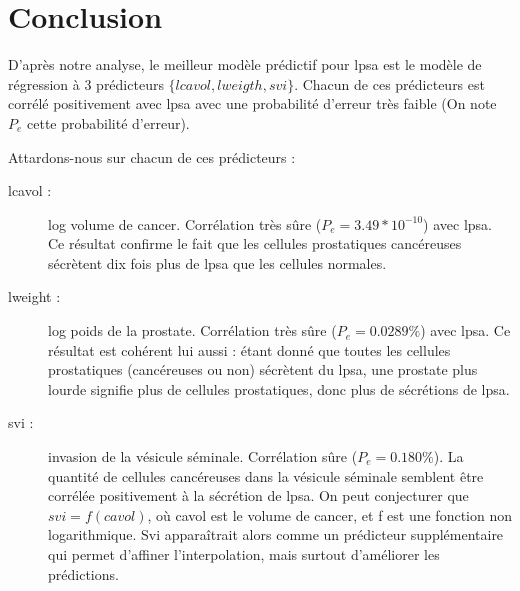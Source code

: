 \documentclass[a4paper, 12pt]{article}
\begin{document}
\begin{enumerate}
\end{enumerate}


\section{Conclusion}

D'après notre analyse, le meilleur modèle prédictif pour lpsa est le modèle de régression à 3 prédicteurs $\{lcavol, lweigth, svi\}$. 
Chacun de ces prédicteurs est corrélé positivement avec lpsa avec une probabilité d'erreur très faible (On note $P_{e}$ cette probabilité d'erreur).

Attardons-nous sur chacun de ces prédicteurs :

\begin{description}
\item[lcavol :] log volume de cancer. Corrélation très sûre ($P_e = 3.49*10^{-10}$) avec lpsa. Ce résultat confirme le fait que les cellules prostatiques cancéreuses sécrètent dix fois plus de lpsa que les cellules normales.
\item[lweight :] log poids de la prostate. Corrélation très sûre ($P_e = 0.0289 \%$) avec lpsa. Ce résultat est cohérent lui aussi : étant donné que toutes les cellules prostatiques (cancéreuses ou non) sécrètent du lpsa, une prostate plus lourde signifie plus de cellules prostatiques, donc plus de sécrétions de lpsa.
\item[svi :] invasion de la vésicule séminale. Corrélation sûre ($P_e = 0.180 \%$). La quantité de cellules cancéreuses dans la vésicule séminale semblent être corrélée positivement à la sécrétion de lpsa. On peut conjecturer que $svi = f(cavol)$, où cavol est le volume de cancer, et f est une fonction non logarithmique. Svi apparaîtrait alors comme un prédicteur supplémentaire qui permet d'affiner l'interpolation, mais surtout d'améliorer les prédictions.
\end{description}
\end{document}
